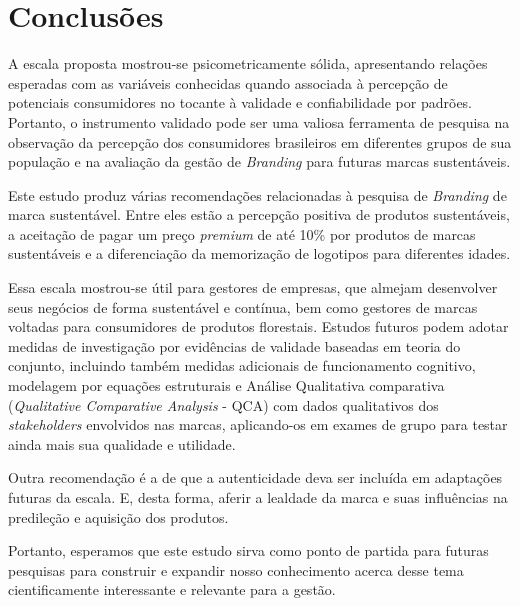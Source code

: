 \section{Conclusões}

A escala proposta mostrou-se psicometricamente sólida, apresentando relações esperadas com as variáveis conhecidas quando associada à percepção de potenciais consumidores no tocante à validade e confiabilidade por padrões. Portanto, o instrumento validado pode ser uma valiosa ferramenta de pesquisa na observação da percepção dos consumidores brasileiros em diferentes grupos de sua população e na avaliação da gestão de \textit{Branding} para futuras marcas sustentáveis.

Este estudo produz várias recomendações relacionadas à pesquisa de \textit{Branding} de marca sustentável. Entre eles estão a percepção positiva de produtos sustentáveis, a aceitação de pagar um preço \textit{premium} de até 10\% por produtos de marcas sustentáveis e a diferenciação da memorização de logotipos para diferentes idades.

Essa escala mostrou-se útil para gestores de empresas, que almejam desenvolver seus negócios de forma sustentável e contínua, bem como gestores de marcas voltadas para consumidores de produtos florestais. Estudos futuros podem adotar medidas de investigação por evidências de validade baseadas em teoria do conjunto, incluindo também medidas adicionais de funcionamento cognitivo, modelagem por equações estruturais e Análise Qualitativa comparativa (\textit{Qualitative Comparative Analysis} - QCA) com dados qualitativos dos \textit{stakeholders} envolvidos nas marcas, aplicando-os em exames de grupo para testar ainda mais sua qualidade e utilidade.

Outra recomendação é a de que a autenticidade deva ser incluída em adaptações futuras da escala. E, desta forma, aferir a lealdade da marca e suas influências na predileção e aquisição dos produtos.

Portanto, esperamos que este estudo sirva como ponto de partida para futuras pesquisas para construir e expandir nosso conhecimento acerca desse tema cientificamente interessante e relevante para a gestão.